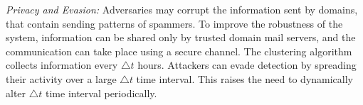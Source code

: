 \emph{Privacy and Evasion:} Adversaries may corrupt the information sent by domains, that contain sending patterns of spammers. To improve the robustness of the system, information can be shared only by trusted domain mail servers, and the communication can take place using a secure channel. The clustering algorithm collects information every \emph{$\bigtriangleup t$} hours. Attackers can evade detection by spreading their activity over a large \emph{$\bigtriangleup t$} time interval. This raises the need to dynamically alter \emph{$\bigtriangleup t$} time interval periodically.
